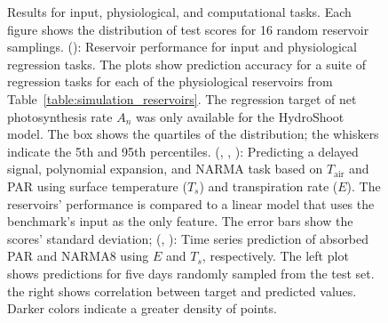 \documentclass[10pt,a4paper,journal]{IEEEtran}
\begin{document}
\begin{figure}[t]
\begin{subfigure}[a]{0.427\linewidth}
        \caption{\null}
        \label{fig:result-narma-scores}
    \end{subfigure}
    \caption{\small
            Results for input, physiological, and computational tasks.
            Each figure shows the distribution of test scores for 16 random reservoir samplings.
            ():
                Reservoir performance for input and physiological regression tasks.
                The plots show prediction accuracy for a suite of regression tasks for each of the physiological reservoirs from \mbox{Table \ref{table:simulation_reservoirs}}.
                The regression target of net photosynthesis rate  $A_n$ was only available for the HydroShoot model.
                The box shows the quartiles of the distribution; the whiskers indicate the 5th and 95th percentiles.
            (, , ):
                Predicting a delayed signal, polynomial expansion, and NARMA task based on $T_{\text{air}}$ and PAR using surface temperature ($T_s$) and transpiration rate ($E$).
                The reservoirs' performance is compared to a linear model that uses the benchmark's input as the only feature.
                The error bars show the scores' standard deviation;
            (, ):
                Time series prediction of absorbed PAR and NARMA8 using $E$ and  $T_s$, respectively.
                The left plot shows predictions for five days randomly sampled from the test set.
                the right shows correlation between target and predicted values. Darker colors indicate a greater density of points.
        }
    \label{fig:results}
\end{figure}
\end{document}
